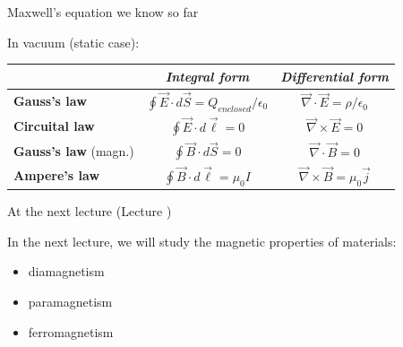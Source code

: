 %
%
%

\begin{frame}{Maxwell's equation we know so far}

In vacuum (static case):

\begin{center}
 {
  \begin{table}[H]
    \begin{tabular}{|l|c|c|}
      \hline
          & {\it Integral form} & {\it Differential form} \\
      \hline
      {\bf Gauss's law} &
        $\oint \vec{E} \cdot d\vec{S} = Q_{enclosed} / \epsilon_0$ &
        $\vec{\nabla} \cdot \vec{E} = \rho / \epsilon_0$ \\

      {\bf Circuital law} &
        $\oint \vec{E} \cdot d\vec{\ell} = 0$ &
        $\vec{\nabla} \times \vec{E} = 0$ \\

      {\bf Gauss's law} (magn.) &
        $\oint \vec{B} \cdot d\vec{S} = 0$ &
        $\vec{\nabla} \cdot \vec{B} = 0$ \\

      {\bf Ampere's law} &
        $\oint \vec{B} \cdot d\vec{\ell} = \mu_{0} I $ &
        $\vec{\nabla} \times \vec{B} = \mu_{0} \vec{j}$ \\

      \hline
    \end{tabular}
  \end{table}
 }
\end{center}

\end{frame}


%
%

\renewcommand{\lecturesummarytitle}{Main points to remember }


%
%

\begin{frame}{At the next lecture (Lecture \nextlecture)}

In the next lecture, we will study the magnetic properties of materials:
\vspace{0.2cm}
\begin{itemize}
  \item diamagnetism
  \item paramagnetism
  \item ferromagnetism
\end{itemize}

\end{frame}

